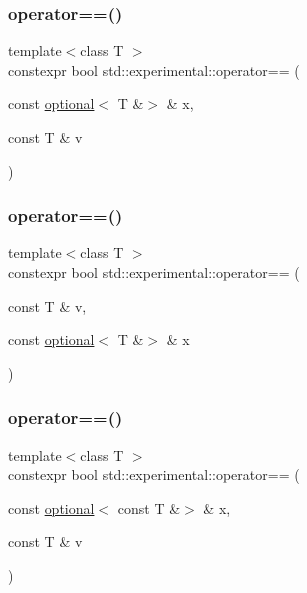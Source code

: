 \mbox{\label{namespacestd_1_1experimental_a5e8049d714e136368d3f1cc2cc7fc787}} 
\subsubsection{\texorpdfstring{operator==()}{operator==()}\hspace{0.1cm}{\footnotesize\ttfamily [6/9]}}
{\footnotesize\ttfamily template$<$class T $>$ \\
constexpr bool std\+::experimental\+::operator== (\begin{DoxyParamCaption}\item[{const \mbox{\hyperlink{classstd_1_1experimental_1_1optional}{optional}}$<$ T \&$>$ \&}]{x,  }\item[{const T \&}]{v }\end{DoxyParamCaption})}

\mbox{\label{namespacestd_1_1experimental_ad874f9e082998b503ad0f7bb0376782e}} 
\subsubsection{\texorpdfstring{operator==()}{operator==()}\hspace{0.1cm}{\footnotesize\ttfamily [7/9]}}
{\footnotesize\ttfamily template$<$class T $>$ \\
constexpr bool std\+::experimental\+::operator== (\begin{DoxyParamCaption}\item[{const T \&}]{v,  }\item[{const \mbox{\hyperlink{classstd_1_1experimental_1_1optional}{optional}}$<$ T \&$>$ \&}]{x }\end{DoxyParamCaption})}

\mbox{\label{namespacestd_1_1experimental_ad41e06efa15d85ead93eafecb8dde126}} 
\subsubsection{\texorpdfstring{operator==()}{operator==()}\hspace{0.1cm}{\footnotesize\ttfamily [8/9]}}
{\footnotesize\ttfamily template$<$class T $>$ \\
constexpr bool std\+::experimental\+::operator== (\begin{DoxyParamCaption}\item[{const \mbox{\hyperlink{classstd_1_1experimental_1_1optional}{optional}}$<$ const T \&$>$ \&}]{x,  }\item[{const T \&}]{v }\end{DoxyParamCaption})}

